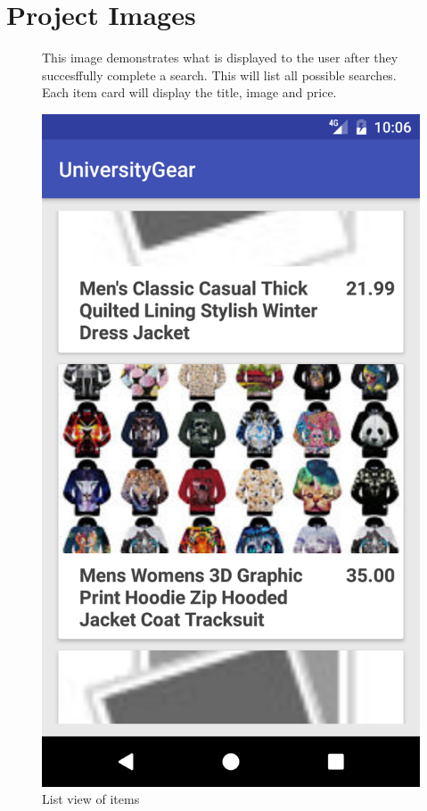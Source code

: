 \documentclass[journal,compsoc, 10pt, draftclsnofoot, onecolumn]{IEEEtran}
\begin{document}
\section{Project Images}
\begin{figure}[h]
This image demonstrates what is displayed to the user after they succesffully 
complete a search. This will list all possible searches. Each item card will display 
the title, image and price. 
\centering
\caption{List view of items}
\includegraphics[scale=.2]{listview}
\end{figure}
\end{document}

